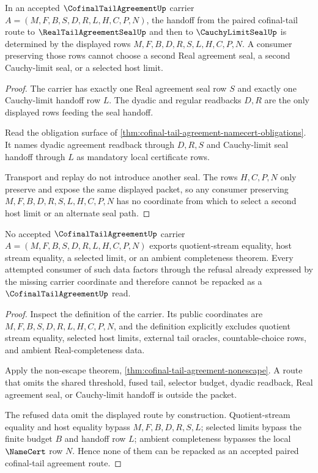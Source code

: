 \begin{theorem}
\label{thm:cofinal-tail-agreement-seal-handoff-determinacy}
In an accepted $\CofinalTailAgreementUp$ carrier $A=(M,F,B,S,D,R,L,H,C,P,N)$, the handoff from the paired cofinal-tail route to $\RealTailAgreementSealUp$ and then to $\CauchyLimitSealUp$ is determined by the displayed rows $M,F,B,D,R,S,L,H,C,P,N$. A consumer preserving those rows cannot choose a second Real agreement seal, a second Cauchy-limit seal, or a selected host limit.
\end{theorem}
\begin{proof}
The carrier has exactly one Real agreement seal row $S$ and exactly one Cauchy-limit handoff row $L$. The dyadic and regular readbacks $D,R$ are the only displayed rows feeding the seal handoff.

Read the obligation surface of \autoref{thm:cofinal-tail-agreement-namecert-obligations}. It names dyadic agreement readback through $D,R,S$ and Cauchy-limit seal handoff through $L$ as mandatory local certificate rows.

Transport and replay do not introduce another seal. The rows $H,C,P,N$ only preserve and expose the same displayed packet, so any consumer preserving $M,F,B,D,R,S,L,H,C,P,N$ has no coordinate from which to select a second host limit or an alternate seal path.
\end{proof}

\begin{theorem}
\label{thm:cofinal-tail-agreement-quotient-stream-refusal}
No accepted $\CofinalTailAgreementUp$ carrier $A=(M,F,B,S,D,R,L,H,C,P,N)$ exports quotient-stream equality, host stream equality, a selected limit, or an ambient completeness theorem. Every attempted consumer of such data factors through the refusal already expressed by the missing carrier coordinate and therefore cannot be repacked as a $\CofinalTailAgreementUp$ read.
\end{theorem}
\begin{proof}
Inspect the definition of the carrier. Its public coordinates are $M,F,B,S,D,R,L,H,C,P,N$, and the definition explicitly excludes quotient stream equality, selected host limits, external tail oracles, countable-choice rows, and ambient Real-completeness data.

Apply the non-escape theorem, \autoref{thm:cofinal-tail-agreement-nonescape}. A route that omits the shared threshold, fused tail, selector budget, dyadic readback, Real agreement seal, or Cauchy-limit handoff is outside the packet.

The refused data omit the displayed route by construction. Quotient-stream equality and host equality bypass $M,F,B,D,R,S,L$; selected limits bypass the finite budget $B$ and handoff row $L$; ambient completeness bypasses the local $\NameCert$ row $N$. Hence none of them can be repacked as an accepted paired cofinal-tail agreement route.
\end{proof}

